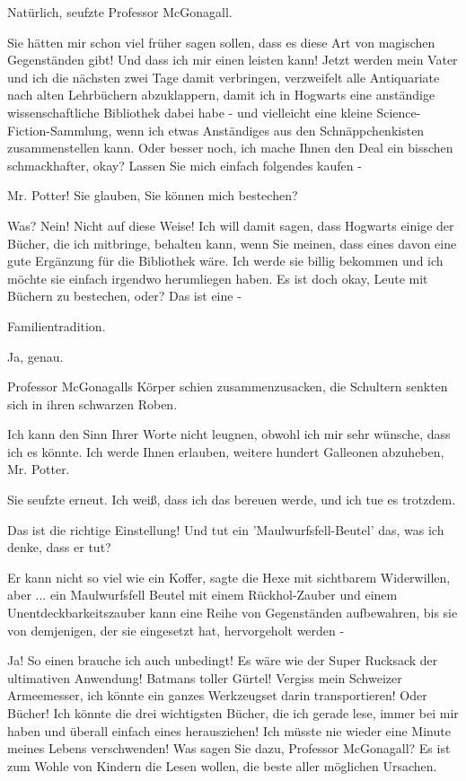 \glqq{}Natürlich\grqq{}, seufzte Professor McGonagall.

\glqq{}Sie hätten mir schon viel früher sagen sollen, dass es diese Art von
magischen Gegenständen gibt! Und dass ich mir einen leisten kann! Jetzt werden
mein Vater und ich die nächsten zwei Tage damit verbringen, verzweifelt alle
Antiquariate nach alten Lehrbüchern abzuklappern, damit ich in Hogwarts eine
anständige wissenschaftliche Bibliothek dabei habe - und vielleicht eine kleine
Science-Fiction-Sammlung, wenn ich etwas Anständiges aus den Schnäppchenkisten
zusammenstellen kann. Oder besser noch, ich mache Ihnen den Deal ein bisschen
schmackhafter, okay? Lassen Sie mich einfach folgendes kaufen -\grqq{}

\glqq{}Mr. Potter! Sie glauben, Sie können mich bestechen?\grqq{}

\glqq{}Was? Nein! Nicht auf diese Weise! Ich will damit sagen, dass Hogwarts
einige der Bücher, die ich mitbringe, behalten kann, wenn Sie meinen, dass eines
davon eine gute Ergänzung für die Bibliothek wäre. Ich werde sie billig bekommen
und ich möchte sie einfach irgendwo herumliegen haben. Es ist doch okay, Leute
mit Büchern zu bestechen, oder? Das ist eine -\grqq{}

\glqq{}Familientradition.\grqq{}

\glqq{}Ja, genau.\grqq{}

Professor McGonagalls Körper schien zusammenzusacken, die Schultern senkten sich
in ihren schwarzen Roben.

\glqq{}Ich kann den Sinn Ihrer Worte nicht leugnen, obwohl ich mir sehr wünsche,
dass ich es könnte. Ich werde Ihnen erlauben, weitere hundert Galleonen
abzuheben, Mr. Potter.\grqq{}

Sie seufzte erneut. \glqq{}Ich weiß, dass ich das bereuen werde, und ich tue es
trotzdem.\grqq{}

\glqq{}Das ist die richtige Einstellung! Und tut ein 'Maulwurfsfell-Beutel' das,
was ich denke, dass er tut?\grqq{}

\glqq{}Er kann nicht so viel wie ein Koffer\grqq{}, sagte die Hexe mit sichtbarem
Widerwillen, \glqq{}aber ... ein Maulwurfsfell Beutel mit einem Rückhol-Zauber
und einem Unentdeckbarkeitszauber kann eine Reihe von Gegenständen aufbewahren,
bis sie von demjenigen, der sie eingesetzt hat, hervorgeholt werden -\grqq{}

\glqq{}Ja! So einen brauche ich auch unbedingt! Es wäre wie der Super Rucksack
der ultimativen Anwendung! Batmans toller Gürtel! Vergiss mein Schweizer
Armeemesser, ich könnte ein ganzes Werkzeugset darin transportieren! Oder
Bücher! Ich könnte die drei wichtigsten Bücher, die ich gerade lese, immer bei
mir haben und überall einfach eines herausziehen! Ich müsste nie wieder eine
Minute meines Lebens verschwenden! Was sagen Sie dazu, Professor McGonagall? Es
ist zum Wohle von Kindern die Lesen wollen, die beste aller möglichen
Ursachen.\grqq{}


